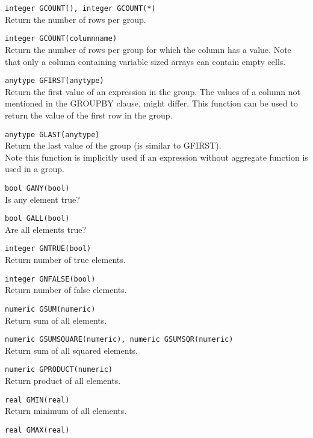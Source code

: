 \begin{description}
  \item[] \texttt{integer GCOUNT(), integer GCOUNT(*)}\\
    Return the number of rows per group.
  \item[] \texttt{integer GCOUNT(columnname)}\\
    Return the number of rows per group for which the column has a
    value. Note that only a column containing variable sized arrays can
    contain empty cells.
  \item \texttt{anytype GFIRST(anytype)}\\
      Return the first value of an expression in the group. The values
      of a column not mentioned in the GROUPBY clause, might
      differ. This function can be used to return the value of the
      first row in the group.
  \item \texttt{anytype GLAST(anytype)}\\
      Return the last value of the group (is similar to GFIRST).
      \\Note this function is implicitly used if an expression without
      aggregate function is used in a group.
  \item[] \texttt{bool GANY(bool)}\\
    Is any element true?
  \item[] \texttt{bool GALL(bool)}\\
    Are all elements true?
  \item[] \texttt{integer GNTRUE(bool)}\\
    Return number of true elements.
  \item[] \texttt{integer GNFALSE(bool)}\\
    Return number of false elements.
  \item[] \texttt{numeric GSUM(numeric)}\\
    Return sum of all elements.
  \item[] \texttt{numeric GSUMSQUARE(numeric), numeric GSUMSQR(numeric)}\\
    Return sum of all squared elements.
  \item[] \texttt{numeric GPRODUCT(numeric)}\\
    Return product of all elements.
  \item[] \texttt{real GMIN(real)}\\
    Return minimum of all elements.
  \item[] \texttt{real GMAX(real)}\\

\end{description}
